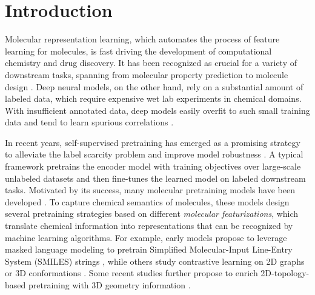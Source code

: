 \section{Introduction}
\label{sec:intro}

Molecular representation learning, which automates the process of feature learning for molecules, is fast driving the development of computational chemistry and drug discovery. It has been recognized as crucial for a variety of downstream tasks, spanning from molecular property prediction to molecule design \cite{Yang:2019al,Du:2022ek}.
Deep neural models, on the other hand, rely on a substantial amount of labeled data, which require expensive wet lab experiments in chemical domains.
With insufficient annotated data, deep models easily overfit to such small training data and tend to learn spurious correlations \cite{Sagawa:2020we}.

In recent years, self-supervised pretraining has emerged as a promising strategy to alleviate the label scarcity problem and improve model robustness \cite{Jing:2021cf}.
A typical framework pretrains the encoder model with training objectives over large-scale unlabeled datasets and then fine-tunes the learned model on labeled downstream tasks.
Motivated by its success, many molecular pretraining models have been developed \cite{Wang:2019hp,Chithrananda:2020eo,Hu:2020uz,You:2020ut,Xu:2021tv,Fang:2022et,Stark:2021ug,Liu:2022vr}.
To capture chemical semantics of molecules, these models design several pretraining strategies based on different \emph{molecular featurizations}, which translate chemical information into representations that can be recognized by machine learning algorithms.
For example, early models \cite{Wang:2019hp,Chithrananda:2020eo} propose to leverage masked language modeling \cite{Bengio:2003vh} to pretrain Simplified Molecular-Input Line-Entry System (SMILES) strings \cite{Weininger:1988sm}, while others study contrastive learning on 2D graphs \cite{Hu:2020uz,You:2020ut,Xu:2021tv} or 3D conformations \cite{Fang:2022et}.
Some recent studies further propose to enrich 2D-topology-based pretraining with 3D geometry information \cite{Stark:2021ug,Liu:2022vr}.

